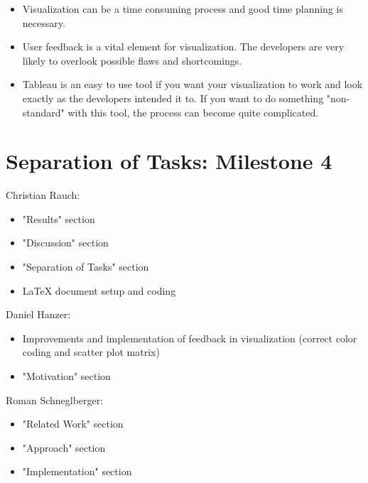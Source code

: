 \documentclass{vgtc}                          %
\begin{document}
\begin{itemize}
\item Visualization can be a time consuming process and good time planning is necessary.
\item User feedback is a vital element for visualization. The developers are very likely to overlook possible flaws and shortcomings.
\item Tableau is an easy to use tool if you want your visualization to work and look exactly as the developers intended it to. If you want to do something "non-standard" with this tool, the process can become quite complicated.
\end{itemize}

\section{Separation of Tasks: Milestone 4}
Christian Rauch:
\begin{itemize}
\item "Results" section
\item "Discussion" section
\item "Separation of Tasks" section
\item LaTeX document setup and coding
\end{itemize}

Daniel Hanzer:
\begin{itemize}
\item Improvements and implementation of feedback in visualization (correct color coding and scatter plot matrix)
\item "Motivation" section
\end{itemize}

Roman Schneglberger:
\begin{itemize}
\item "Related Work" section
\item "Approach" section
\item "Implementation" section
\end{itemize}
\end{document}
